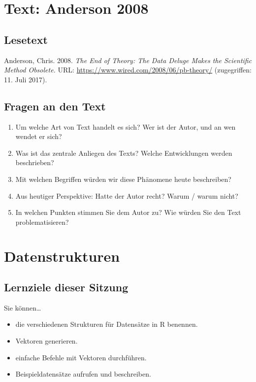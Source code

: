 \documentclass[11pt,german,a4paper]{article}
\providecommand{\tightlist}{%
  \setlength{\itemsep}{0pt}\setlength{\parskip}{0pt}}
\begin{document}
\hypertarget{text-anderson-2008}{%
\section{Text: Anderson 2008}\label{text-anderson-2008}}

\hypertarget{lesetext}{%
\subsection{Lesetext}\label{lesetext}}

Anderson, Chris. 2008. \emph{The End of Theory: The Data Deluge Makes the Scientific Method Obsolete.} URL: \url{https://www.wired.com/2008/06/pb-theory/} (zugegriffen: 11. Juli 2017).

\hypertarget{fragen-an-den-text}{%
\subsection{Fragen an den Text}\label{fragen-an-den-text}}

\begin{enumerate}
\def\labelenumi{\arabic{enumi}.}
\tightlist
\item
  Um welche Art von Text handelt es sich? Wer ist der Autor, und an wen wendet er sich?
\item
  Was ist das zentrale Anliegen des Texts? Welche Entwicklungen werden beschrieben?
\item
  Mit welchen Begriffen würden wir diese Phänomene heute beschreiben?
\item
  Aus heutiger Perspektive: Hatte der Autor recht? Warum / warum nicht?
\item
  In welchen Punkten stimmen Sie dem Autor zu? Wie würden Sie den Text problematisieren?
\end{enumerate}

\hypertarget{datenstrukturen}{%
\section{Datenstrukturen}\label{datenstrukturen}}

\hypertarget{lernziele-dieser-sitzung}{%
\subsection{Lernziele dieser Sitzung}\label{lernziele-dieser-sitzung}}

Sie können\ldots{}

\begin{itemize}
\tightlist
\item
  die verschiedenen Strukturen für Datensätze in R benennen.
\item
  Vektoren generieren.
\item
  einfache Befehle mit Vektoren durchführen.
\item
  Beispieldatensätze aufrufen und beschreiben.
\end{itemize}
\end{document}
